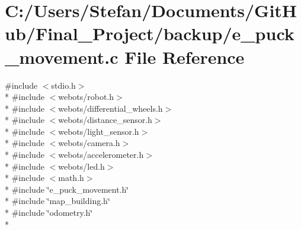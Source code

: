 \section{C\-:/\-Users/\-Stefan/\-Documents/\-Git\-Hub/\-Final\-\_\-\-Project/backup/e\-\_\-puck\-\_\-movement.c File Reference}
\label{backup_2e__puck__movement_8c}
{\ttfamily \#include $<$stdio.\-h$>$}\\*
{\ttfamily \#include $<$webots/robot.\-h$>$}\\*
{\ttfamily \#include $<$webots/differential\-\_\-wheels.\-h$>$}\\*
{\ttfamily \#include $<$webots/distance\-\_\-sensor.\-h$>$}\\*
{\ttfamily \#include $<$webots/light\-\_\-sensor.\-h$>$}\\*
{\ttfamily \#include $<$webots/camera.\-h$>$}\\*
{\ttfamily \#include $<$webots/accelerometer.\-h$>$}\\*
{\ttfamily \#include $<$webots/led.\-h$>$}\\*
{\ttfamily \#include $<$math.\-h$>$}\\*
{\ttfamily \#include \char`\"{}e\-\_\-puck\-\_\-movement.\-h\char`\"{}}\\*
{\ttfamily \#include \char`\"{}map\-\_\-building.\-h\char`\"{}}\\*
{\ttfamily \#include \char`\"{}odometry.\-h\char`\"{}}\\*
